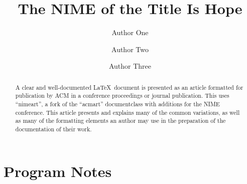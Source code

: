 \documentclass[acmsmall]{nimeart}
\begin{document}
\title{The NIME of the Title Is Hope}

\author{Author One}

\author{Author Two}

\author{Author Three}

\renewcommand{\shortauthors}{Trovato et al.}

\begin{abstract}
  A clear and well-documented \LaTeX\ document is presented as an
  article formatted for publication by ACM in a conference proceedings
  or journal publication. This uses ``nimeart'', a fork of the ``acmart''
  documentclass with additions for the NIME conference. This
  article presents and explains many of the common variations, as well
  as many of the formatting elements an author may use in the
  preparation of the documentation of their work.
\end{abstract}


\maketitle

\section{Program Notes}
\end{document}
